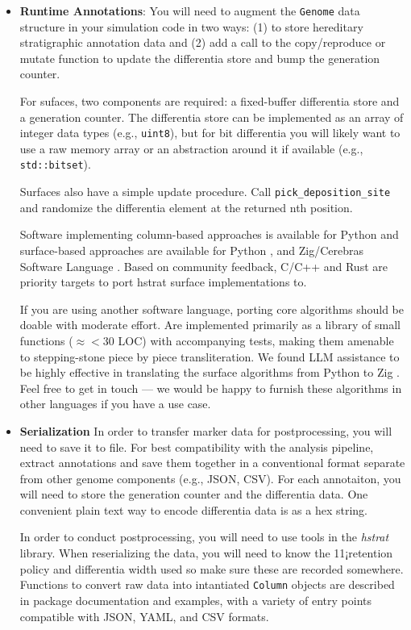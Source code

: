 \begin{itemize}
\item \textbf{Runtime Annotations}: 
You will need to augment the \texttt{Genome} data structure in your simulation code in two ways: (1) to store hereditary stratigraphic annotation data and (2) add a call to the copy/reproduce or mutate function to update the differentia store and bump the generation counter.

For sufaces, two components are required: a fixed-buffer differentia store and a generation counter.
The differentia store can be implemented as an array of integer data types (e.g., \texttt{uint8}), but for bit differentia you will likely want to use a raw memory array or an abstraction around it if available (e.g., \texttt{std::bitset}).

Surfaces also have a simple update procedure.
Call \texttt{pick\_deposition\_site} and randomize the differentia element at the returned nth position.

Software implementing column-based approaches is available for Python \citep{moreno2022hstrat} and surface-based approaches are available for Python \citep{TODO}, and Zig/Cerebras Software Language \citep{TODO}.
Based on community feedback, C/C++ and Rust are priority targets to port hstrat surface implementations to.

If you are using another software language, porting core algorithms should be doable with moderate effort.
Are implemented primarily as a library of small functions ($\approx<30$ LOC) with accompanying tests, making them amenable to stepping-stone piece by piece transliteration.
We found LLM assistance to be highly effective in translating the surface algorithms from Python to Zig \citep{TODO}.
Feel free to get in touch --- we would be happy to furnish these algorithms in other languages if you have a use case.
\item \textbf{Serialization}
In order to transfer marker data for postprocessing, you will need to save it to file.
For best compatibility with the analysis pipeline, extract annotations and save them together in a conventional format separate from other genome components (e.g., JSON, CSV).
For each annotaiton, you will need to store the generation counter and the differentia data.
One convenient plain text way to encode differentia data is as a hex string.

In order to conduct postprocessing, you will need to use tools in the \textit{hstrat} library.
When reserializing the data, you will need to know the 11¡retention policy and differentia width used so make sure these are recorded somewhere.
Functions to convert raw data into intantiated \texttt{Column} objects are described in package documentation and examples, with a variety of entry points compatible with JSON, YAML, and CSV formats. 


\end{itemize}

